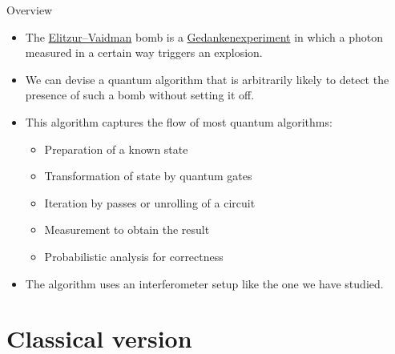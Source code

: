 
\begin{frame}{Overview}

\begin{itemize}
    \item The \href{https://en.wikipedia.org/wiki/Elitzur-Vaidman_bomb_tester}{Elitzur--Vaidman} bomb is a \href{https://en.wikipedia.org/wiki/Thought_experiment}{Gedankenexperiment} in which a photon measured in a certain way triggers an explosion.
    \item We can devise a quantum algorithm that is arbitrarily likely to detect the presence of such a bomb without setting it off.
    \item This algorithm captures the flow of most quantum algorithms:
    \begin{itemize}
        \item Preparation of a known state
        \item Transformation of state by quantum gates
        \item Iteration by passes or unrolling of a circuit
        \item Measurement to obtain the result
        \item Probabilistic analysis for correctness
    \end{itemize}
    \item The algorithm uses an interferometer setup like the one we have studied.
\end{itemize}
    
\end{frame}

\section{Classical version}

